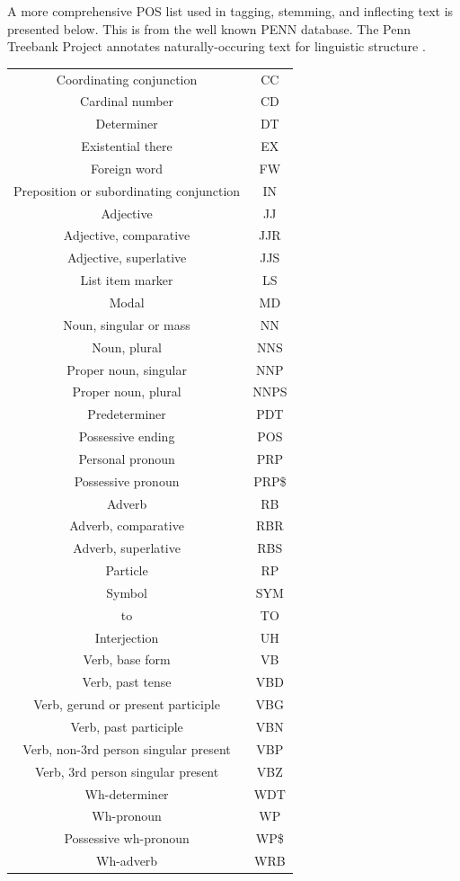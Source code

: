 A more comprehensive POS list used in tagging, stemming, and inflecting text is presented below.
This is from the well known PENN database.  The Penn Treebank Project annotates naturally-occuring text for linguistic structure \cite{PENNTREEBANK}.
\begin{tiny}
\begin{tabular}{|c|c|}
  \hline
Coordinating conjunction	&	CC	\\
Cardinal number	&	CD	\\
Determiner	&	DT	\\
Existential there 	&	EX	\\
Foreign word	&	FW	\\
Preposition or subordinating conjunction	&	IN	 \\
Adjective	&	JJ	\\
Adjective, comparative	&	JJR	\\
Adjective, superlative	&	JJS	\\
List item marker	&	LS	\\
Modal	&	MD	\\
Noun, singular or mass	&	NN	\\
Noun, plural	&	NNS	\\
Proper noun, singular	&	NNP	\\
Proper noun, plural	&	NNPS	\\
Predeterminer	&	PDT	\\
Possessive ending	&	POS	\\
Personal pronoun	&	PRP	\\
Possessive pronoun	&	PRP\$	\\
Adverb	&	RB	\\
Adverb, comparative	&	RBR	\\
Adverb, superlative	&	RBS	\\
Particle	&	RP	\\
Symbol	&	SYM	\\
to	&	TO	\\
Interjection	&	UH	\\
Verb, base form	&	VB	\\
Verb, past tense	&	VBD	\\
Verb, gerund or present participle	&	VBG	\\
Verb, past participle	&	VBN	\\
Verb, non-3rd person singular present	&	VBP	\\
Verb, 3rd person singular present	&	VBZ	\\
Wh-determiner	&	WDT	\\
Wh-pronoun	&	WP	\\
Possessive wh-pronoun	&	WP\$	\\
Wh-adverb	&	WRB	\\
  \hline
\end{tabular}
\end{tiny}


